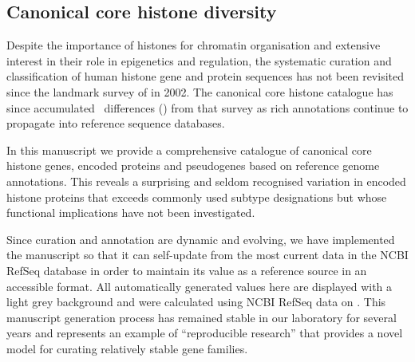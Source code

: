   \subsection{Canonical core histone diversity}

    Despite the importance of histones for chromatin organisation and extensive interest
    in their role in epigenetics and regulation, the systematic
    curation and classification of human histone
    gene and protein sequences has not been revisited
    since the landmark survey of \citet{Marzluff02} in 2002.
    The canonical core histone catalogue has since accumulated
    \TotalChangesSinceReference{}~differences ()
    from that survey as rich annotations continue to propagate
    into reference sequence databases.

    In this manuscript we provide a comprehensive catalogue
    of canonical core histone genes, encoded proteins and pseudogenes 
    based on reference genome annotations.
    This reveals a surprising and seldom recognised variation in encoded histone proteins
    that exceeds commonly used subtype designations
    but whose functional implications have not been investigated.

    Since curation and annotation are dynamic and evolving,
    we have implemented the manuscript so that it can
    self-update from the most current data in the NCBI RefSeq database
    in order to maintain its value as a reference source in an accessible format.
    All automatically generated values here are displayed with a light grey background
    and were calculated using NCBI RefSeq data on \printdate{\SequencesDate{}}.
    This manuscript generation process has remained stable in our laboratory for several years
    and represents an example of ``reproducible research'' \citep{Claerbout2000}
    that provides a novel model for curating relatively stable gene families.
